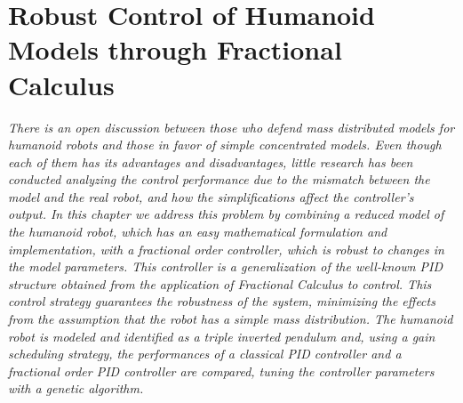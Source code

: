 \chapter{Robust Control of Humanoid Models through Fractional Calculus}\label{frac_chapter}
\textit{There is an open discussion between those who defend mass distributed models for humanoid robots and those in favor of simple concentrated models. Even though each of them has its advantages and disadvantages, little research has been conducted analyzing the control performance due to the mismatch between the model and the real robot, and how the simplifications affect the controller’s output. In this chapter we address this problem by combining a reduced model of the humanoid robot, which has an easy mathematical formulation and implementation, with a fractional order controller, which is robust to changes in the model parameters. This controller is a generalization of the well-known PID structure obtained from the application of Fractional Calculus to control. This control strategy guarantees the robustness of the system, minimizing the effects from the assumption that the robot has a simple mass distribution. The humanoid robot is modeled and identified as a triple inverted pendulum and, using a gain scheduling strategy, the performances of a classical PID controller and a fractional order PID controller are compared, tuning the controller parameters with a genetic algorithm.}
\newpage









